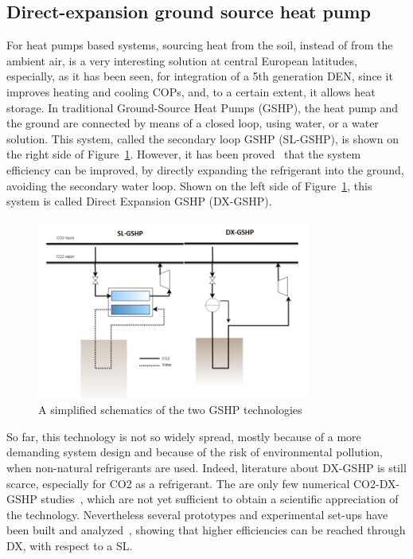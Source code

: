 \documentclass{article}
\begin{document}
\subsection{Direct-expansion ground source heat pump}\label{ss:dx}

For heat pumps based systems, sourcing heat from the soil, instead of from the ambient air, is a very interesting solution at central European latitudes, especially, as it has been seen, for integration of a 5th generation DEN, since it improves heating and cooling COPs, and, to a certain extent, it allows heat storage. In traditional Ground-Source Heat Pumps (GSHP), the heat pump and the ground are connected by means of a closed loop, using water, or a water solution. This system, called the secondary loop GSHP (SL-GSHP), is shown on the right side of Figure~\ref{fig:gshp}. However, it has been proved~\cite{kruseStatusDevelopmentResearch2010, guoTechnoeconomicComparisonDirect2012} that the system efficiency can be improved, by directly expanding the refrigerant into the ground, avoiding the secondary water loop. Shown on the left side of Figure~\ref{fig:gshp}, this system is called Direct Expansion GSHP (DX-GSHP). 

\begin{figure}[htp]
\centering
\includegraphics[width=0.8\textwidth]{CO2-DX}
\caption{A simplified schematics of the two GSHP technologies}
\label{fig:gshp}
\end{figure}

So far, this technology is not so widely spread, mostly because of a more demanding system design and because of the risk of environmental pollution, when non-natural refrigerants are used. Indeed, literature about DX-GSHP is still scarce, especially for CO2 as a refrigerant. The are only few numerical CO2-DX-GSHP studies~\cite{eslami-nejadModelingTwophaseCO2filled2014,ghazizade-ahsaeeEnergyExergyInvestigation2018,austinParametricStudyPerformance2011,eslami-nejadQuasitransientModelTranscritical2015}, which are not yet sufficient to obtain a scientific appreciation of the technology. Nevertheless several prototypes and experimental set-ups have been built and analyzed~\cite{eslami-nejadDetailedTheoreticalCharacterization2018, badacheExperimentalStudyCarbon2018, guoTechnoeconomicComparisonDirect2012}, showing that higher efficiencies can be reached through DX, with respect to a SL.
\end{document}
